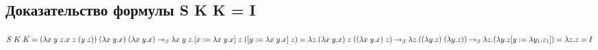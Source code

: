 \documentclass{article}
\begin{document}
\begin{center}
\section*{Доказательство формулы S K K = I}

$S\;K\;K = (\lambda x\;y\;z.x\;z\;(y\;z))\;(\lambda x\;y.x)\;(\lambda x\;y.x) \to_\beta \\
\lambda x\;y\;z.[x:=\lambda x\;y.x]\;z\;([y:=\lambda x\;y.x]\;z)=\lambda z. (\lambda x\;y.x)\;z\; ((\lambda x\;y.x)\;z)\to_\beta\\
\lambda z. ((\lambda y.z)\;(\lambda y.z)) \to_\beta \lambda z. (\lambda y.z[y:=\lambda y_1.z_1]) = \lambda z.z=I$

\end{center}
\end{document}
